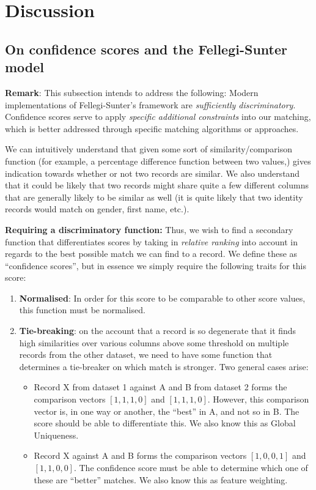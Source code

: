 \section{Discussion}
\label{sec:discussion}

\subsection{On confidence scores and the Fellegi-Sunter model}
\label{subsec:confidence-fellegi-sunter}

\textbf{Remark}: This subsection intends to address the following: Modern implementations of Fellegi-Sunter’s framework are \textit{sufficiently discriminatory}. Confidence scores serve to apply \textit{specific additional constraints} into our matching, which is better addressed through specific matching algorithms or approaches.

We can intuitively understand that given some sort of similarity/comparison function (for example, a percentage difference function between two values,) gives indication towards whether or not two records are similar. We also understand that it could be likely that two records might share quite a few different columns that are generally likely to be similar as well (it is quite likely that two identity records would match on gender, first name, etc.).

\textbf{Requiring a discriminatory function:}
Thus, we wish to find a secondary function that differentiates scores by taking in \textit{relative ranking} into account in regards to the best possible match we can find to a record. We define these as “confidence scores”, but in essence we simply require the following traits for this score:

\begin{enumerate}
  \item \textbf{Normalised}: In order for this score to be comparable to other score values, this function must be normalised.
  \item \textbf{Tie-breaking}: on the account that a record is so degenerate that it finds high similarities over various columns above some threshold on multiple records from the other dataset, we need to have some function that determines a tie-breaker on which match is stronger. Two general cases arise:
  \begin{itemize}
    \item[a)] Record X from dataset 1 against A and B from dataset 2 forms the comparison vectors $[1,1,1,0]$ and $[1,1,1,0]$. However, this comparison vector is, in one way or another, the “best” in A, and not so in B. The score should be able to differentiate this. We also know this as Global Uniqueness.
    \item[b)] Record X against A and B forms the comparison vectors $[1,0,0,1]$ and $[1,1,0,0]$. The confidence score must be able to determine which one of these are “better” matches. We also know this as feature weighting.
  \end{itemize}
\end{enumerate}

